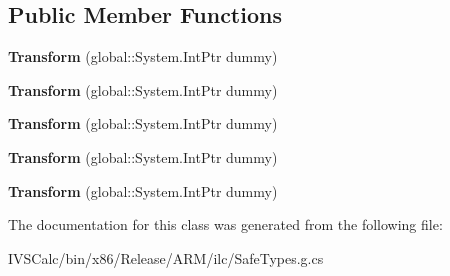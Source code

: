 \subsection*{Public Member Functions}
\begin{DoxyCompactItemize}
\item 
\mbox{\label{class_windows_1_1_u_i_1_1_xaml_1_1_media_1_1_transform_aa86e80688aac8012f626e48ef8f0adf3}} 
{\bfseries Transform} (global\+::\+System.\+Int\+Ptr dummy)
\item 
\mbox{\label{class_windows_1_1_u_i_1_1_xaml_1_1_media_1_1_transform_aa86e80688aac8012f626e48ef8f0adf3}} 
{\bfseries Transform} (global\+::\+System.\+Int\+Ptr dummy)
\item 
\mbox{\label{class_windows_1_1_u_i_1_1_xaml_1_1_media_1_1_transform_aa86e80688aac8012f626e48ef8f0adf3}} 
{\bfseries Transform} (global\+::\+System.\+Int\+Ptr dummy)
\item 
\mbox{\label{class_windows_1_1_u_i_1_1_xaml_1_1_media_1_1_transform_aa86e80688aac8012f626e48ef8f0adf3}} 
{\bfseries Transform} (global\+::\+System.\+Int\+Ptr dummy)
\item 
\mbox{\label{class_windows_1_1_u_i_1_1_xaml_1_1_media_1_1_transform_aa86e80688aac8012f626e48ef8f0adf3}} 
{\bfseries Transform} (global\+::\+System.\+Int\+Ptr dummy)
\end{DoxyCompactItemize}


The documentation for this class was generated from the following file\+:\begin{DoxyCompactItemize}
\item 
I\+V\+S\+Calc/bin/x86/\+Release/\+A\+R\+M/ilc/Safe\+Types.\+g.\+cs\end{DoxyCompactItemize}
